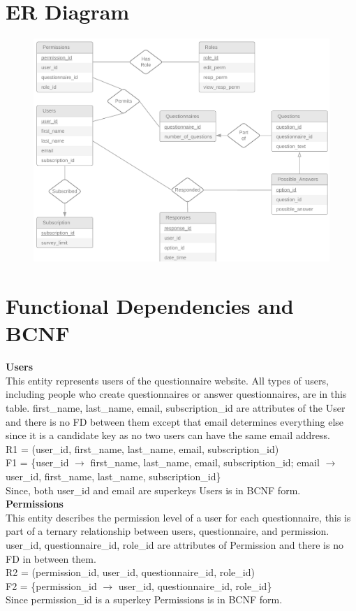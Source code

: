 \documentclass[12pt, oneside, a4paper]{article}
\newcommand{\tb}[1]{\textbf{#1}}
\begin{document}
    \section{ER Diagram}
    \FloatBarrier
    \begin{figure}[H] 
        \centerline{
        \includegraphics[width=\textwidth]{er_diagram.png}
        }
    \end{figure}
    \newpage
    \section{Functional Dependencies and BCNF}
    \tb{Users} \\
    This entity represents users of the questionnaire website.
    All types of users, including people who create questionnaires
    or answer questionnaires, are in this table. first\_name, last\_name, email, subscription\_id are attributes of the User and there is no FD between them except that email determines everything else since it is a candidate key as no two users can have the same email address. \\
    R1 = (user\_id, first\_name, last\_name, email, subscription\_id) \\
    F1 = \{user\_id \(\rightarrow\) first\_name, last\_name, email, subscription\_id; email \(\rightarrow\) user\_id, first\_name, last\_name, subscription\_id\} \\
    Since, both user\_id and email are superkeys Users is in BCNF form. 
    \\

    \tb{Permissions} \\
    This entity describes the permission level of a user for each 
    questionnaire, this is part of a ternary relationship between users, questionnaire, and permission. user\_id, questionnaire\_id, role\_id are attributes of Permission and there is no FD in between them. \\
    R2 = (permission\_id, user\_id, questionnaire\_id, role\_id) \\
    F2 = \{permission\_id \(\rightarrow\) user\_id, questionnaire\_id, role\_id\} \\
    Since permission\_id is a superkey Permissions is in BCNF form. 
    \\
    
\end{document}
